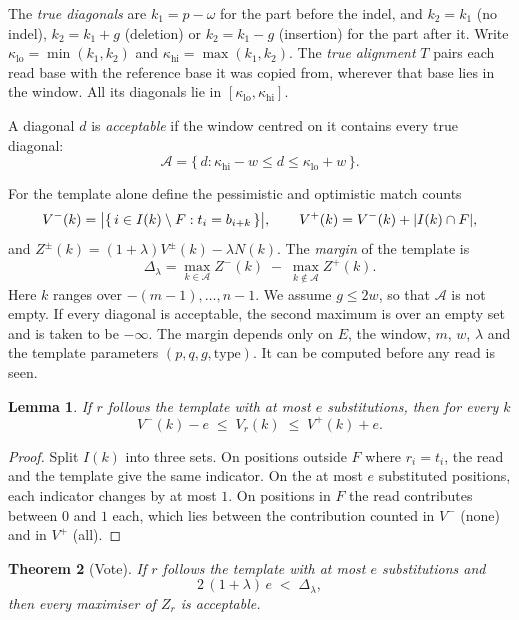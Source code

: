\documentclass[11pt]{article}
\theoremstyle{plain}
\newtheorem{theorem}{Theorem}[section]
\newtheorem{lemma}[theorem]{Lemma}
\theoremstyle{definition}
\theoremstyle{remark}
\DeclarePairedDelimiter{\abs}{\lvert}{\rvert}
\newcommand{\A}{\mathcal{A}}
\newcommand{\kaplo}{\kappa_{\mathrm{lo}}}
\newcommand{\kaphi}{\kappa_{\mathrm{hi}}}
\begin{document}
The \emph{true diagonals} are $k_1 = p - \omega$ for the part before the indel,
and $k_2 = k_1$ (no indel), $k_2 = k_1 + g$ (deletion) or $k_2 = k_1 - g$
(insertion) for the part after it. Write $\kaplo = \min(k_1,k_2)$ and
$\kaphi = \max(k_1,k_2)$. The \emph{true alignment} $T$ pairs each read base
with the reference base it was copied from, wherever that base lies in the
window. All its diagonals lie in $[\kaplo,\kaphi]$.

A diagonal $d$ is \emph{acceptable} if the window centred on it contains every
true diagonal:
\[
\A = \{\, d : \kaphi - w \le d \le \kaplo + w \,\}.
\]

For the template alone define the pessimistic and optimistic match counts
\[
V^{-}(k) = \abs[\big]{\{\, i \in I(k)\setminus F : t_i = b_{i+k} \,\}},
\qquad
V^{+}(k) = V^{-}(k) + \abs{I(k) \cap F},
\]
and $Z^{\pm}(k) = (1+\lambda)V^{\pm}(k) - \lambda N(k)$. The \emph{margin} of the
template is
\begin{equation}\label{eq:margin}
\Delta_\lambda = \max_{k \in \A} Z^{-}(k) \;-\; \max_{k \notin \A} Z^{+}(k).
\end{equation}
Here $k$ ranges over $-(m-1),\dots,n-1$. We assume $g \le 2w$, so that $\A$ is
not empty. If every diagonal is acceptable, the second maximum is over an empty
set and is taken to be $-\infty$.
The margin depends only on $E$, the window, $m$, $w$, $\lambda$ and the template
parameters $(p, q, g, \text{type})$. It can be computed before any read is seen.

\begin{lemma}\label{lem:perturb}
If $r$ follows the template with at most $e$ substitutions, then for every $k$
\[
V^{-}(k) - e \;\le\; V_r(k) \;\le\; V^{+}(k) + e .
\]
\end{lemma}

\begin{proof}
Split $I(k)$ into three sets. On positions outside $F$ where $r_i = t_i$, the
read and the template give the same indicator. On the at most $e$ substituted
positions, each indicator changes by at most $1$. On positions in $F$ the read
contributes between $0$ and $1$ each, which lies between the contribution
counted in $V^{-}$ (none) and in $V^{+}$ (all).
\end{proof}

\begin{theorem}[Vote]\label{thm:vote}
If $r$ follows the template with at most $e$ substitutions and
\begin{equation}\label{eq:votecond}
2\,(1+\lambda)\,e \;<\; \Delta_\lambda ,
\end{equation}
then every maximiser of $Z_r$ is acceptable.
\end{theorem}
\end{document}

